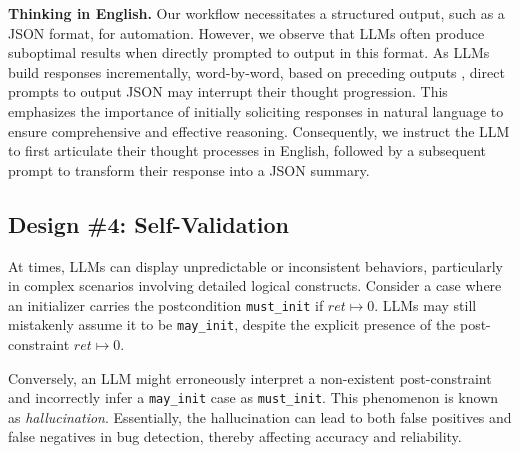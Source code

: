 \vspace{3pt}
\noindent
\textbf{Thinking in English.} 
Our workflow necessitates a structured output, such as a JSON format, for automation. However, we observe that LLMs often produce suboptimal results when directly prompted to output in this format. As LLMs build responses incrementally, word-by-word, based on preceding outputs \cite{vaswani_attention_2017}, direct prompts to output JSON may interrupt their thought progression. This emphasizes the importance of initially soliciting responses in natural language to ensure comprehensive and effective reasoning. Consequently, we instruct the LLM to first articulate their thought processes in English, followed by a subsequent prompt to transform their response into a JSON summary.






\subsection{Design \#4: Self-Validation}
\label{subsec:self_refine}


At times, LLMs can display unpredictable or inconsistent behaviors, particularly in complex scenarios involving detailed logical constructs. Consider a case where an initializer carries the postcondition \texttt{must\_init} if \(ret \mapsto 0\). LLMs may still mistakenly assume it to be \texttt{may\_init}, despite the explicit presence of the post-constraint \(ret \mapsto 0\).

Conversely, an LLM might erroneously interpret a non-existent post-constraint and incorrectly infer a \texttt{may\_init} case as \texttt{must\_init}. 
This phenomenon is known as \textit{hallucination}.
Essentially, the hallucination can lead to both false positives and false negatives in bug detection, thereby affecting accuracy and reliability. 



